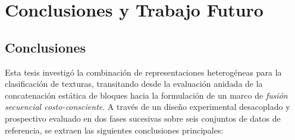\chapter{Conclusiones y Trabajo Futuro}\label{sec:conclusion}

\section{Conclusiones}

Esta tesis investigó la combinación de representaciones heterogéneas para la clasificación de texturas, transitando desde la evaluación anidada de la concatenación estática de bloques hacia la formulación de un marco de \emph{fusión secuencial costo-consciente}. A través de un diseño experimental desacoplado y prospectivo evaluado en dos fases sucesivas sobre seis conjuntos de datos de referencia, se extraen las siguientes conclusiones principales:

